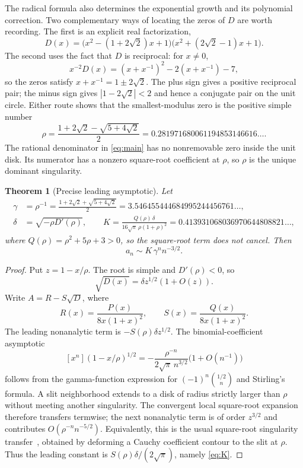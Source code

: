 \documentclass[11pt,letterpaper]{article}
\numberwithin{equation}{section}
\newtheorem{theorem}{Theorem}[section]
\theoremstyle{definition}
\newcommand{\coeff}[2]{[#1^{#2}]}
\begin{document}
The radical formula also determines the exponential growth and its
polynomial correction. Two complementary ways of locating the zeros of
$D$ are worth recording. The first is an explicit real factorization,
\begin{equation}
 D(x)=\bigl(x^2-(1+2\sqrt2)x+1\bigr)
      \bigl(x^2+(2\sqrt2-1)x+1\bigr).
 \label{eq:Dfactor}
\end{equation}
The second uses the fact that $D$ is reciprocal: for $x\ne0$,
\begin{equation}
 x^{-2}D(x)=(x+x^{-1})^2-2(x+x^{-1})-7,
 \label{eq:reciprocal}
\end{equation}
so the zeros satisfy $x+x^{-1}=1\pm2\sqrt2$. The plus sign gives a
positive reciprocal pair; the minus sign gives $|1-2\sqrt2|<2$ and hence
a conjugate pair on the unit circle. Either route shows that the
smallest-modulus zero is the positive simple number
\begin{equation}
 \rho=\frac{1+2\sqrt2-\sqrt{5+4\sqrt2}}2
       =0.281971680061194853146616\ldots.
 \label{eq:rho}
\end{equation}
The rational denominator in \eqref{eq:main} has no nonremovable zero
inside the unit disk. Its numerator has a nonzero square-root coefficient
at $\rho$, so $\rho$ is the unique dominant singularity.

\begin{theorem}[Precise leading asymptotic]
\label{thm:asymp}
Let
\begin{align}
 \gamma&=\rho^{-1}
       =\frac{1+2\sqrt2+\sqrt{5+4\sqrt2}}2
        =3.546455444684995244456761\ldots,\label{eq:gamma}\\
 \delta&=\sqrt{-\rho D'(\rho)},\qquad
 K=\frac{Q(\rho)\,\delta}
          {16\sqrt\pi\,\rho(1+\rho)^2}
       =0.413931068036970644808821\ldots,
 \label{eq:K}
\end{align}
where $Q(\rho)=\rho^2+5\rho+3>0$, so the square-root term does not cancel.
Then
\begin{equation}
 \boxed{a_n\sim K\,\gamma^n n^{-3/2}.}
 \label{eq:asymp}
\end{equation}
\end{theorem}
\begin{proof}
Put $z=1-x/\rho$. The root is simple and $D'(\rho)<0$, so
\[
 \sqrt{D(x)}=\delta z^{1/2}(1+O(z)).
\]
Write $A=R-S\sqrt D$, where
\[
 R(x)=\frac{P(x)}{8x(1+x)^2},\qquad
 S(x)=\frac{Q(x)}{8x(1+x)^2}.
\]
The leading nonanalytic term is $-S(\rho)\delta z^{1/2}$.
The binomial-coefficient asymptotic
\[
 \coeff{x}{n}(1-x/\rho)^{1/2}
 =-\frac{\rho^{-n}}{2\sqrt\pi\,n^{3/2}}
     \bigl(1+O(n^{-1})\bigr)
\]
follows from the gamma-function expression for $(-1)^n\binom{1/2}{n}$
and Stirling's formula. A slit neighborhood extends to a disk of radius
strictly larger than $\rho$ without meeting another singularity.
The convergent local square-root expansion therefore transfers termwise;
the next nonanalytic term is of order $z^{3/2}$ and contributes
$O(\rho^{-n}n^{-5/2})$. Equivalently, this is the usual square-root
singularity transfer~\cite{flajolet-sedgewick}, obtained by deforming a
Cauchy coefficient contour
to the slit at $\rho$. Thus the leading constant is
$S(\rho)\delta/(2\sqrt\pi)$, namely \eqref{eq:K}.
\end{proof}
\end{document}
